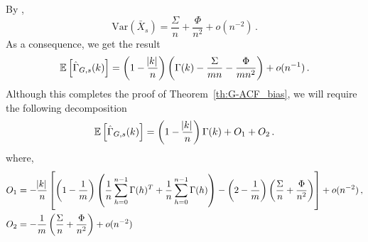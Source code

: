 \documentclass[11pt]{article}
\newcommand{\E}{\mathbb{E}}
\newcommand{\Var}{\text{Var}}
\theoremstyle{remark}
\begin{document}
By \cite[Proposition 1]{song1995optimal},
\[
\Var(\bar{X}_s) = \dfrac{\Sigma}{n} + \dfrac{\Phi}{n^2} + o(n^{-2})\,.
\]
As a consequence, we get the result 
\[
 \E \left[\hat{\Gamma}_{G,s}(k) \right] =  \left(1- \dfrac{\abs{k}}{n}\right)\left( \Gamma(k) - \dfrac{\Sigma}{mn} - \dfrac{\Phi}{mn^2} \right) + o(n^{-1})\,.
\]
Although this completes the proof of Theorem~\ref{th:G-ACF_bias}, we will require the following decomposition
 \begin{equation} \label{eq:G-ACF_expec_breakdown}
     \mathbb{E}\left[\hat{\Gamma}_{G,s}(k)\right] = \left(1- \dfrac{\abs{k}}{n}\right)\Gamma(k) + O_1 + O_2\,.
 \end{equation}
%
where,
\begin{align*}
    O_1 &= -\dfrac{\abs{k}}{n}\left[\left(1-\dfrac{1}{m}\right)\left(\dfrac{1}{n}\sum_{h=0}^{n-1}\Gamma(h)^T + \dfrac{1}{n}\sum_{h=0}^{n-1}\Gamma(h)\right) - \left(2-\dfrac{1}{m}\right) \left(\dfrac{\Sigma}{n} + \dfrac{\Phi}{n^2}\right)\right] + o(n^{-2})\, ,\\
    O_2 &= -\dfrac{1}{m}\left(\dfrac{\Sigma}{n} + \dfrac{\Phi}{n^2}\right) + o(n^{-2})
\end{align*}
%
%
\end{document}
